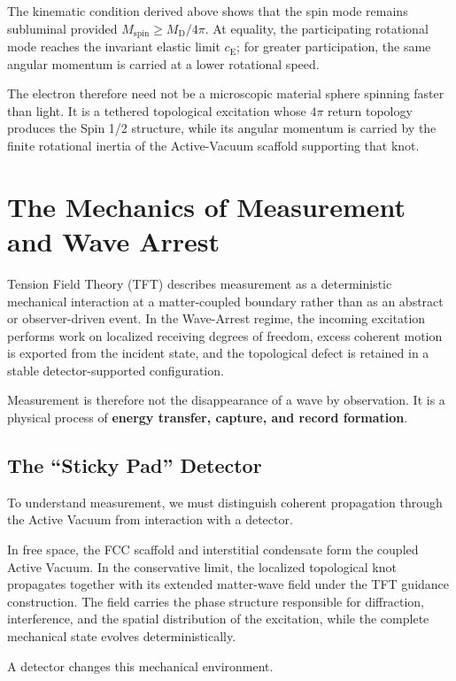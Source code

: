 The kinematic condition derived above shows that the spin mode remains subluminal provided $M_{\mathrm{spin}} \geq M_{\mathrm D}/4\pi$. At equality, the participating rotational mode reaches the invariant elastic limit $c_{\mathrm E}$; for greater participation, the same angular momentum is carried at a lower rotational speed. 

The electron therefore need not be a microscopic material sphere spinning faster than light. It is a tethered topological excitation whose $4\pi$ return topology produces the Spin 1/2 structure, while its angular momentum is carried by the finite rotational inertia of the Active-Vacuum scaffold supporting that knot.
\section{The Mechanics of Measurement and Wave Arrest}
\label{sec:measurement_wave_arrest}

Tension Field Theory (TFT) describes measurement as a deterministic mechanical interaction at a matter-coupled boundary rather than as an abstract or observer-driven event. In the Wave-Arrest regime, the incoming excitation performs work on localized receiving degrees of freedom, excess coherent motion is exported from the incident state, and the topological defect is retained in a stable detector-supported configuration.

Measurement is therefore not the disappearance of a wave by observation. It is a physical process of \textbf{energy transfer, capture, and record formation}.

\subsection{The ``Sticky Pad'' Detector}

To understand measurement, we must distinguish coherent propagation through the Active Vacuum from interaction with a detector.

In free space, the FCC scaffold and interstitial condensate form the coupled Active Vacuum. In the conservative limit, the localized topological knot propagates together with its extended matter-wave field under the TFT guidance construction. The field carries the phase structure responsible for diffraction, interference, and the spatial distribution of the excitation, while the complete mechanical state evolves deterministically.

A detector changes this mechanical environment.

